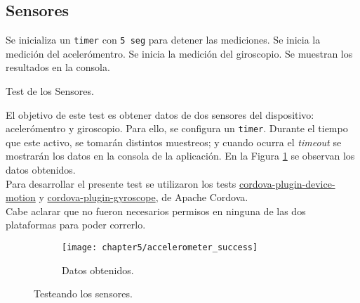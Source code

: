 \subsection{Sensores}
\begin{algorithm}
	\begin{algorithmic}[1]
		\STATE Se inicializa un \texttt{timer} con \texttt{5 seg} para detener las mediciones.
		\STATE Se inicia la medición del acelerómentro.
		\STATE Se inicia la medición del giroscopio.
		\STATE Se muestran los resultados en la consola.
	\end{algorithmic}
	\caption{Test de los Sensores.}\label{alg:chap5_test_sensors}
\end{algorithm}
El objetivo de este test es obtener datos de dos sensores del dispositivo: acelerómentro y giroscopio. Para ello, se configura un \texttt{timer}. Durante el tiempo que este activo, se tomarán distintos muestreos; y cuando ocurra el \emph{timeout} se mostrarán los datos en la consola de la aplicación. En la Figura \ref{fig:ch05:accelerometer_success} se observan los datos obtenidos.\\
Para desarrollar el presente test se utilizaron los tests \href{https://www.npmjs.com/package/cordova-plugin-device-motion}{cordova-plugin-device-motion} y \href{https://www.npmjs.com/package/cordova-plugin-gyroscope}{cordova-plugin-gyroscope}, de Apache Cordova.\\
Cabe aclarar que no fueron necesarios permisos en ninguna de las dos plataformas para poder correrlo.
\begin{figure}[hbtp]
    \centering
	\begin{subfigure}{.3\linewidth}
	    \centering
		\texttt{[image: chapter5/accelerometer\_success]}
		\caption{Datos obtenidos.}
		\label{fig:ch05:accelerometer_success}
	\end{subfigure}
	\caption{Testeando los sensores.}
	\label{fig:chapter05:sensors_test}
\end{figure}
\newpage
